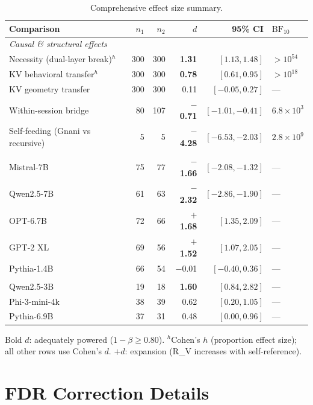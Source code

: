 \documentclass{article}
\newcommand{\dcohen}{d}
\begin{document}
\begin{table}[h]
\centering
\caption{Comprehensive effect size summary.}
\label{tab:effects}
\small
\begin{tabular}{lrrrrl}
\toprule
Comparison & $n_1$ & $n_2$ & $\dcohen$ & 95\% CI & $\text{BF}_{10}$ \\
\midrule
\multicolumn{6}{l}{\emph{Causal \& structural effects}} \\
Necessity (dual-layer break)$^h$ & 300 & 300 & \textbf{1.31} & $[1.13, 1.48]$ & $> 10^{54}$ \\
KV behavioral transfer$^h$ & 300 & 300 & \textbf{0.78} & $[0.61, 0.95]$ & $> 10^{18}$ \\
KV geometry transfer & 300 & 300 & 0.11 & $[-0.05, 0.27]$ & --- \\
Within-session bridge & 80 & 107 & \textbf{$-$0.71} & $[-1.01, -0.41]$ & $6.8 \times 10^3$ \\
Self-feeding (Gnani vs recursive) & 5 & 5 & \textbf{$-$4.28} & $[-6.53, -2.03]$ & $2.8 \times 10^9$ \\
\addlinespace
\multicolumn{6}{l}{\emph{Cross-architecture}} \\
Mistral-7B & 75 & 77 & \textbf{$-$1.66} & $[-2.08, -1.32]$ & --- \\
Qwen2.5-7B & 61 & 63 & \textbf{$-$2.32} & $[-2.86, -1.90]$ & --- \\
OPT-6.7B & 72 & 66 & \textbf{$+$1.68} & $[1.35, 2.09]$ & --- \\
GPT-2 XL & 69 & 56 & \textbf{$+$1.52} & $[1.07, 2.05]$ & --- \\
Pythia-1.4B & 66 & 54 & $-$0.01 & $[-0.40, 0.36]$ & --- \\
\addlinespace
\multicolumn{6}{l}{\emph{Scaling gap}} \\
Qwen2.5-3B & 19 & 18 & \textbf{1.60} & $[0.84, 2.82]$ & --- \\
Phi-3-mini-4k & 38 & 39 & 0.62 & $[0.20, 1.05]$ & --- \\
Pythia-6.9B & 37 & 31 & 0.48 & $[0.00, 0.96]$ & --- \\
\bottomrule
\end{tabular}
\vspace{1mm}

\raggedright\footnotesize
Bold $\dcohen$: adequately powered ($1{-}\beta \geq 0.80$). $^h$Cohen's $h$ (proportion effect size); all other rows use Cohen's $d$. $+d$: expansion (R\_V increases with self-reference).
\end{table}


\section{FDR Correction Details}
\label{app:fdr}
\end{document}
